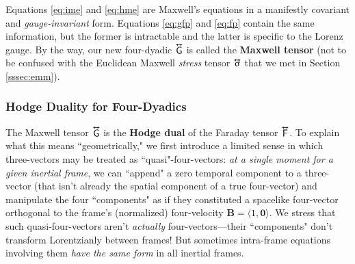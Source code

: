 \documentclass[12pt]{article}
\renewcommand{\vv}[1]{\mathbf{#1}}
\newcommand{\tightoverset}[2]{%
  \mathop{#2}\limits^{\vbox to -.5ex{\kern-0.75ex\hbox{$#1$}\vss}}}
\newcommand{\inlinedy}[1]{\tightoverset{\text{\tiny$\bm\leftrightarrow$}}{#1}}
\begin{document}
Equations \ref{eq:ime} and \ref{eq:hme} are Maxwell's equations in a manifestly covariant and \emph{gauge-invariant} form. Equations \ref{eq:gfp} and \ref{eq:fp} contain the same information, but the former is intractable and the latter is specific to the Lorenz gauge. By the way, our new four-dyadic $\inlinedy{\mathsf{G}}$ is called the \textbf{Maxwell tensor} (not to be confused with the Euclidean Maxwell \emph{stress} tensor $\inlinedy{\upsigma}$ that we met in Section \ref{sssec:emm}).


\subsubsection{Hodge Duality for Four-Dyadics}\label{sssec:hd}

The Maxwell tensor $\inlinedy{\mathsf{G}}$ is the \textbf{Hodge dual} of the Faraday tensor $\inlinedy{\mathsf{F}}$. To explain what this means ``geometrically," we first introduce a limited sense in which three-vectors may be treated as ``quasi"-four-vectors: \emph{at a single moment for a given inertial frame}, we can ``append" a zero temporal component to a three-vector (that isn't already the spatial component of a true four-vector) and manipulate the four ``components" as if they constituted a spacelike four-vector orthogonal to the frame's (normalized) four-velocity $\vv B = \langle 1, \vv 0 \rangle$. We stress that such quasi-four-vectors aren't \emph{actually} four-vectors---their ``components" don't transform Lorentzianly between frames! But sometimes intra-frame equations involving them \emph{have the same form} in all inertial frames.
\end{document}

